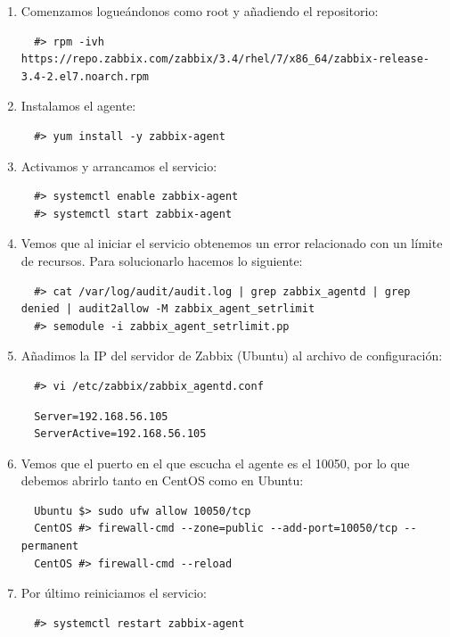\documentclass[12pt,spanish]{article}
\begin{document}
\begin{enumerate}
  \item Comenzamos logueándonos como root y añadiendo el repositorio:
  \begin{lstlisting}
  #> rpm -ivh https://repo.zabbix.com/zabbix/3.4/rhel/7/x86_64/zabbix-release-3.4-2.el7.noarch.rpm
  \end{lstlisting}
  \item Instalamos el agente:
  \begin{lstlisting}
  #> yum install -y zabbix-agent
  \end{lstlisting}
  \item Activamos y arrancamos el servicio:
  \begin{lstlisting}
  #> systemctl enable zabbix-agent
  #> systemctl start zabbix-agent
  \end{lstlisting}
  \item Vemos que al iniciar el servicio obtenemos un error relacionado con un límite de recursos. Para solucionarlo hacemos lo siguiente:
  \begin{lstlisting}
  #> cat /var/log/audit/audit.log | grep zabbix_agentd | grep denied | audit2allow -M zabbix_agent_setrlimit
  #> semodule -i zabbix_agent_setrlimit.pp
  \end{lstlisting}
  \item Añadimos la IP del servidor de Zabbix (Ubuntu) al archivo de configuración:
  \begin{lstlisting}
  #> vi /etc/zabbix/zabbix_agentd.conf
  \end{lstlisting}
  \begin{lstlisting}
  Server=192.168.56.105
  ServerActive=192.168.56.105
  \end{lstlisting}
  \item Vemos que el puerto en el que escucha el agente es el 10050, por lo que debemos abrirlo tanto en CentOS como en Ubuntu:
  \begin{lstlisting}
  Ubuntu $> sudo ufw allow 10050/tcp
  CentOS #> firewall-cmd --zone=public --add-port=10050/tcp --permanent
  CentOS #> firewall-cmd --reload
  \end{lstlisting}
  \item Por último reiniciamos el servicio:
  \begin{lstlisting}
  #> systemctl restart zabbix-agent
  \end{lstlisting}

\end{enumerate}
\end{document}
